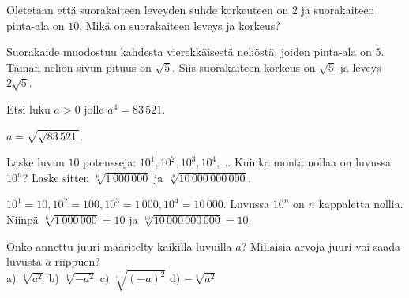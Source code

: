 \begin{tehtavasivu}
\begin{tehtava}
Oletetaan että suorakaiteen leveyden suhde korkeuteen on $2$ ja suorakaiteen pinta-ala on $10$. Mikä on suorakaiteen 
leveys ja korkeus?
\begin{vastaus}
Suorakaide muodostuu kahdesta vierekkäisestä neliöstä, joiden pinta-ala on $5$. Tämän neliön sivun pituus on $\sqrt{5}$. Siis suorakaiteen korkeus on $\sqrt{5}$ ja leveys $2\sqrt{5}$.
\end{vastaus}
\end{tehtava}

\begin{tehtava}
Etsi luku $a>0$ jolle $a^4=83\,521$.
\begin{vastaus}
$a=\sqrt{\sqrt{83\,521}}$.
\end{vastaus}
\end{tehtava}

\begin{tehtava}
Laske luvun $10$ potensseja: $10^1, 10^2, 10^3, 10^4, \ldots$ Kuinka monta nollaa on luvussa $10^n$? Laske sitten $\sqrt[6]{1\,000\,000}$ ja $\sqrt[10]{10\,000\,000\,000}$.

\begin{vastaus}
$10^1 = 10, 10^2 = 100, 10^3 = 1\,000, 10^4 = 10\,000$. Luvussa $10^n$ on $n$ kappaletta nollia. Niinpä $\sqrt[6]{1\,000\,000} = 10$ ja $\sqrt[10]{10\,000\,000\,000} = 10$.
\end{vastaus}
\end{tehtava}

\begin{tehtava}
Onko annettu juuri määritelty kaikilla luvuilla $a$? Millaisia arvoja juuri voi saada luvusta $a$ riippuen?\\
a) $\sqrt[4]{a^2}$ \quad b) $\sqrt[4]{-a^2}$ \quad c) $\sqrt[4]{(-a)^2}$ \quad d) $- \sqrt[4]{a^2}$

\begin{vastaus}

\end{vastaus}
\end{tehtava}


\end{tehtavasivu}
